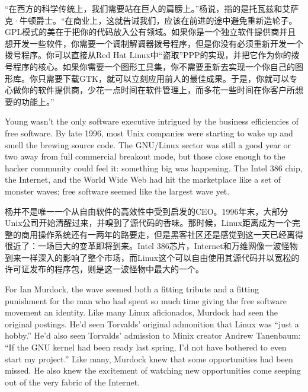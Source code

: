 \ifdefined\chs
``在西方的科学传统上，我们需要站在巨人的肩膀上。''杨说，指的是托瓦兹和艾萨克·牛顿爵士。``在商业上，这就告诫我们，应该在前进的途中避免重新造轮子。GPL模式的美在于把你的代码放入公有领域。如果你是一个独立软件提供商并且想开发一些软件，你需要一个调制解调器拨号程序，但是你没有必须重新开发一个拨号程序。你可以直接从Red Hat Linux中``盗取''PPP的实现，并把它作为你的拨号程序的核心。如果你需要一个图形工具集，你不需要重新去实现一个你自己的图形库。你只需要下载GTK，就可以立刻应用前人的最佳成果。于是，你就可以专心做你的软件提供商，少花一点时间在软件管理上，而多花一些时间在你客户所想要的功能上。''
\fi

\ifdefined\eng
Young wasn't the only software executive intrigued by the business efficiencies of free software. By late 1996, most Unix companies were starting to wake up and smell the brewing source code. The GNU/Linux sector was still a good year or two away from full commercial breakout mode, but those close enough to the hacker community could feel it: something big was happening. The Intel 386 chip, the Internet, and the World Wide Web had hit the marketplace like a set of monster waves; free software seemed like the largest wave yet.
\fi

\ifdefined\chs
杨并不是唯一一个从自由软件的高效性中受到启发的CEO。1996年末，大部分Unix公司开始清醒过来，并嗅到了源代码的香味。那时候，Linux距离成为一个完整的商用操作系统还有一两年的路要走，但是黑客社区还是感觉到这一天已经离得很近了：一场巨大的变革即将到来。Intel 386芯片，Internet和万维网像一波怪物到来一样深入的影响了整个市场，而Linux这个可以自由使用其源代码并以宽松的许可证发布的程序包，则是这一波怪物中最大的一个。
\fi

\ifdefined\eng
For Ian Murdock, the wave seemed both a fitting tribute and a fitting punishment for the man who had spent so much time giving the free software movement an identity. Like many Linux aficionados, Murdock had seen the original postings. He'd seen Torvalds' original admonition that Linux was ``just a hobby.'' He'd also seen Torvalds' admission to Minix creator Andrew Tanenbaum: ``If the GNU kernel had been ready last spring, I'd not have bothered to even start my project.'' Like many, Murdock knew that some opportunities had been missed.  He also knew the excitement of watching new opportunities come seeping out of the very fabric of the Internet.
\fi

